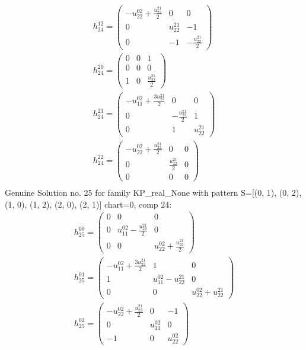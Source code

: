 \documentclass[a4paper, 11pt, twoside, onecolumn]{article}
\begin{document}
\begin{landscape}
\begin{gather*}
	 h_{24}^{12}=\begin{pmatrix}- u^{02}_{22} + \frac{u^{21}_{22}}{2} & 0 & 0\\0 & u^{21}_{22} & -1\\0 & -1 & - \frac{u^{21}_{22}}{2}\end{pmatrix}\\ 
	 h_{24}^{20}=\begin{pmatrix}0 & 0 & 1\\0 & 0 & 0\\1 & 0 & \frac{u^{21}_{22}}{2}\end{pmatrix}\\ 
	 h_{24}^{21}=\begin{pmatrix}- u^{02}_{11} + \frac{3 u^{21}_{22}}{2} & 0 & 0\\0 & - \frac{u^{21}_{22}}{2} & 1\\0 & 1 & u^{21}_{22}\end{pmatrix}\\ 
	 h_{24}^{22}=\begin{pmatrix}- u^{02}_{22} + \frac{u^{21}_{22}}{2} & 0 & 0\\0 & \frac{u^{21}_{22}}{2} & 0\\0 & 0 & 0\end{pmatrix}\\ 
\end{gather*} 
Genuine Solution no. 25 for family KP_real_None with pattern S=[(0, 1), (0, 2), (1, 0), (1, 2), (2, 0), (2, 1)] chart=0, comp 24: 
\begin{gather*} 
	 h_{25}^{00}=\begin{pmatrix}0 & 0 & 0\\0 & u^{02}_{11} - \frac{u^{21}_{22}}{2} & 0\\0 & 0 & u^{02}_{22} + \frac{u^{21}_{22}}{2}\end{pmatrix}\\ 
	 h_{25}^{01}=\begin{pmatrix}- u^{02}_{11} + \frac{3 u^{21}_{22}}{2} & 1 & 0\\1 & u^{02}_{11} - u^{21}_{22} & 0\\0 & 0 & u^{02}_{22} + u^{21}_{22}\end{pmatrix}\\ 
	 h_{25}^{02}=\begin{pmatrix}- u^{02}_{22} + \frac{u^{21}_{22}}{2} & 0 & -1\\0 & u^{02}_{11} & 0\\-1 & 0 & u^{02}_{22}\end{pmatrix}\\ 

\end{gather*}
\end{landscape}
\end{document}
